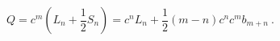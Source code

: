 \begin{equation}
Q = c^{m} (L_{n} + \frac{1}{2} S_{n}) = c^{n}L_{n} + 
\frac{1}{2} (m-n)c^{n}c^{m}b_{m+n}~.
\end{equation}

